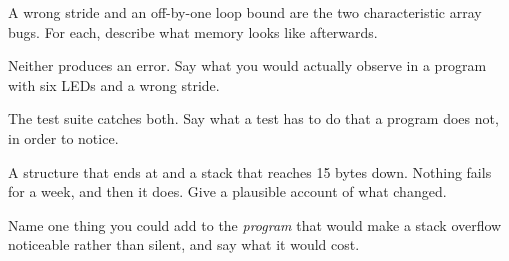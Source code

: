 \label{c4:ex:wrong}
\begin{parts}
  \item A wrong stride and an off-by-one loop bound are the two characteristic array bugs. For
    each, describe what memory looks like afterwards.
  \item Neither produces an error. Say what you would actually observe in a program with six LEDs
    and a wrong stride.
  \item The test suite catches both. Say what a test has to do that a program does not, in order to
    notice.
  \item A structure that ends at  and a stack that reaches 15 bytes down. Nothing fails for a
    week, and then it does. Give a plausible account of what changed.
  \item Name one thing you could add to the \emph{program} that would make a stack overflow
    noticeable rather than silent, and say what it would cost.
\end{parts}
